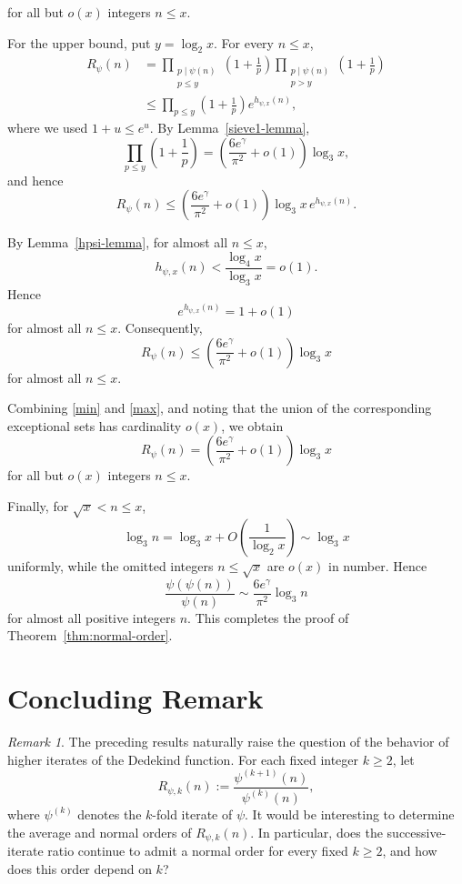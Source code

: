 \documentclass{article}
\theoremstyle{remark}
\newtheorem{remark}{Remark}
\begin{document}
for all but \(o(x)\) integers \(n\le x\).

For the upper bound, put \(y=\log_2x\). For every \(n\le x\),
\[
\begin{aligned}
R_\psi(n)
&=
\prod_{\substack{p\mid\psi(n)\\p\le y}}
\left(1+\frac1p\right)
\prod_{\substack{p\mid\psi(n)\\p>y}}
\left(1+\frac1p\right)\\
&\le
\prod_{p\le y}\left(1+\frac1p\right)
e^{h_{\psi,x}(n)},
\end{aligned}
\]
where we used \(1+u\le e^u\). By Lemma~\ref{sieve1-lemma},
\[
\prod_{p\le y}\left(1+\frac1p\right)
=
\left(\frac{6e^\gamma}{\pi^2}+o(1)\right)\log_3x,
\]
and hence
\[
R_\psi(n)
\le
\left(\frac{6e^\gamma}{\pi^2}+o(1)\right)
\log_3x\,e^{h_{\psi,x}(n)}.
\]

By Lemma~\ref{hpsi-lemma}, for almost all \(n\le x\),
\[
h_{\psi,x}(n)
<
\frac{\log_4x}{\log_3x}
=
o(1).
\]
Hence
\[
e^{h_{\psi,x}(n)}
=
1+o(1)
\]
for almost all \(n\le x\). Consequently,
\begin{equation}\label{max}
R_\psi(n)
\le
\left(\frac{6e^\gamma}{\pi^2}+o(1)\right)\log_3x
\end{equation}
for almost all \(n\le x\).


Combining \eqref{min} and \eqref{max}, and noting that the union of
the corresponding exceptional sets has cardinality \(o(x)\), we obtain
\[
R_\psi(n)
=
\left(\frac{6e^\gamma}{\pi^2}+o(1)\right)\log_3x
\]
for all but \(o(x)\) integers \(n\le x\).

Finally, for \(\sqrt{x}<n\le x\),
\[
\log_3n
=
\log_3x+O\left(\frac1{\log_2x}\right)
\sim\log_3x
\]
uniformly, while the omitted integers \(n\le\sqrt{x}\) are \(o(x)\)
in number. Hence
\[
\frac{\psi(\psi(n))}{\psi(n)}
\sim
\frac{6e^\gamma}{\pi^2}\log_3n
\]
for almost all positive integers \(n\). This completes the proof of Theorem~\ref{thm:normal-order}.


\section{\bf Concluding Remark}
\medskip

\begin{remark}
The preceding results naturally raise the question of the behavior of
higher iterates of the Dedekind function. For each fixed integer
\(k\ge2\), let
\[
R_{\psi,k}(n)
:=
\frac{\psi^{(k+1)}(n)}{\psi^{(k)}(n)},
\]
where \(\psi^{(k)}\) denotes the \(k\)-fold iterate of \(\psi\).
It would be interesting to determine the average and normal orders of
\(R_{\psi,k}(n)\). In particular, does the successive-iterate ratio
continue to admit a normal order for every fixed \(k\ge2\), and how
does this order depend on \(k\)?
\end{remark}
\end{document}
